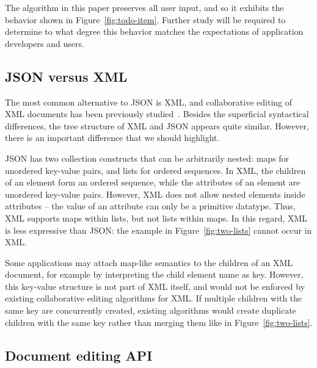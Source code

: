 \documentclass[10pt,journal,compsoc]{IEEEtran}
\begin{document}
The algorithm in this paper preserves all user input, and so it exhibits the behavior shown in Figure~\ref{fig:todo-item}. Further study will be required to determine to what degree this behavior matches the expectations of application developers and users.

\subsection{JSON versus XML}\label{sec:json-xml}

The most common alternative to JSON is XML, and collaborative editing of XML documents has been previously studied~\cite{Davis:2002iv,Ignat:2003jy,Wang:2015vo}. Besides the superficial syntactical differences, the tree structure of XML and JSON appears quite similar. However, there is an important difference that we should highlight.

JSON has two collection constructs that can be arbitrarily nested: maps for unordered key-value pairs, and lists for ordered sequences. In XML, the children of an element form an ordered sequence, while the attributes of an element are unordered key-value pairs. However, XML does not allow nested elements inside attributes -- the value of an attribute can only be a primitive datatype. Thus, XML supports maps within lists, but not lists within maps. In this regard, XML is less expressive than JSON: the example in Figure~\ref{fig:two-lists} cannot occur in XML.

Some applications may attach map-like semantics to the children of an XML document, for example by interpreting the child element name as key. However, this key-value structure is not part of XML itself, and would not be enforced by existing collaborative editing algorithms for XML. If multiple children with the same key are concurrently created, existing algorithms would create duplicate children with the same key rather than merging them like in Figure~\ref{fig:two-lists}.

\subsection{Document editing API}\label{sec:editing-api}
\end{document}
